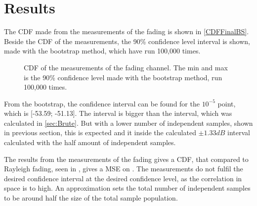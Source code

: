 \section{Results}

The CDF made from the measurements of the fading is shown in \autoref{CDFFinalBS}. Beside the CDF of the measurements, the 90\% confidence level interval is shown, made with the bootstrap method, which have run 100,000 times.

\begin{figure}[H]

\caption{CDF of the measurements of the fading channel. The min and max is the 90\% confidence level made with the bootstrap method, run 100,000 times.}
\label{CDFFinalBS}
\end{figure}

From the bootstrap, the confidence interval can be found for the $10^{-5}$ point, which is [-53.59; -51.13]. The interval is bigger than the interval, which was calculated in \autoref{sec:Brute}. But with a lower number of independent samples, shown in previous section, this is expected and it inside the calculated $\pm 1.33dB$ interval calculated with the half amount of independent samples.


The results from the measurements of the fading gives a CDF, that compared to Rayleigh fading, seen in , gives a MSE on . The measurements do not fulfil the desired confidence interval at the desired confidence level, as the correlation in space is to high. An approximation sets the total number of independent samples to be around half the size of the total sample population.







